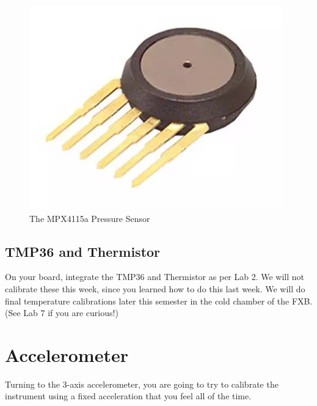 \documentclass[12pt]{article}
\begin{document}
	\begin{figure}[h]
		\begin{center}
			\includegraphics[scale=0.9]{Figures/MPX4115a.jpg}
			\caption{The MPX4115a Pressure Sensor}
		\end{center}
	\end{figure}
\subsection*{TMP36 and Thermistor}
On your board, integrate the TMP36 and Thermistor as per Lab 2. We will not calibrate these this week, since you learned how to do this last week. We will do final temperature calibrations later this semester in the cold chamber of the FXB. (See Lab 7 if you are curious!)

	\section{Accelerometer}
    
    Turning to the 3-axis accelerometer, you are going to try to calibrate the instrument using a fixed acceleration that you feel all of the time.
    
\end{document}
